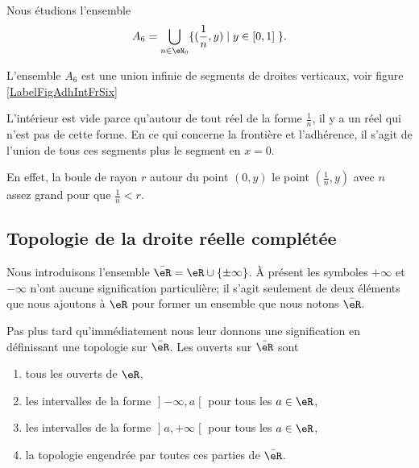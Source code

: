 \begin{example}\label{ItemexoEspVectoNorme0003iv}
	Nous étudions l'ensemble
	\begin{equation}
		A_6 = \bigcup _{ n \in \eN_0} \{ ( \frac 1n, y ) \; | \; y \in [0,1] \; \}.
	\end{equation}

	L'ensemble $A_6$ est une union infinie de segments de droites verticaux, voir figure \ref{LabelFigAdhIntFrSix}
	\newcommand{\CaptionFigAdhIntFrSix}{Le segment sur l'axe vertical entre $y=0$ et $y=1$ fait partie de l'adhérence et de la frontière, mais pas de l'ensemble $A_6$ lui-même.}
	
	L'intérieur est vide parce qu'autour de tout réel de la forme $\frac{1}{ n }$, il y a un réel qui n'est pas de cette forme. En ce qui concerne la frontière et l'adhérence, il s'agit de l'union de tous ces segments plus le segment en $x=0$.

	En effet, la boule de rayon $r$ autour du point $(0,y)$ le point $(\frac{1}{ n },y)$ avec $n$ assez grand pour que $\frac{1}{ n }<r$.
\end{example}


\subsection{Topologie de la droite réelle complétée}
\label{SUBSECooKRRUooSlZSmM}

Nous introduisons l'ensemble \( \bar\eR=\eR\cup\{ \pm\infty \}\). À présent les symboles \( +\infty\) et \( -\infty\) n'ont aucune signification particulière; il s'agit seulement de deux éléments que nous ajoutons à \( \eR\) pour former un ensemble que nous notons \( \bar \eR\).

Pas plus tard qu'immédiatement nous leur donnons une signification en définissant une topologie sur \( \bar\eR\). Les ouverts sur \( \bar \eR\) sont
\begin{enumerate}
	\item
	      tous les ouverts de \( \eR\),
	\item
	      les intervalles de la forme \( \mathopen] -\infty , a \mathclose[\) pour tous les \( a\in \eR\),
	\item
	      les intervalles de la forme \( \mathopen] a , +\infty \mathclose[\) pour tous les \( a\in \eR\),
	\item
	      la topologie engendrée par toutes ces parties de \( \bar \eR\).
\end{enumerate}

